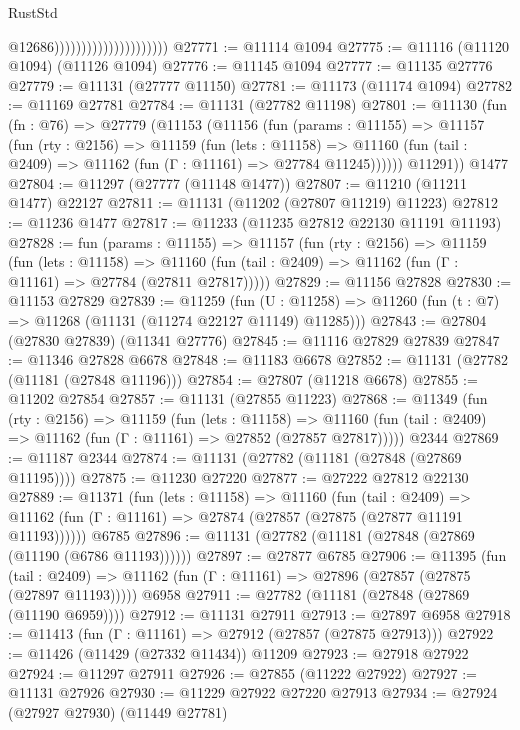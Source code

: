 \begin{lexlean}{RustStd}
\begin{coremodule}
                                              @12686)))))))))))))))))))))
@27771 := @11114 @1094
@27775 := @11116 (@11120 @1094) (@11126 @1094)
@27776 := @11145 @1094
@27777 := @11135 @27776
@27779 := @11131 (@27777 @11150)
@27781 := @11173 (@11174 @1094)
@27782 := @11169 @27781
@27784 := @11131 (@27782 @11198)
@27801 := @11130
    (fun (fn : @76) =>
    @27779
      (@11153
        (@11156
          (fun (params : @11155) =>
          @11157
            (fun (rty : @2156) =>
            @11159
              (fun (lets : @11158) =>
              @11160 (fun (tail : @2409) => @11162 (fun (Γ : @11161) => @27784 @11245))))))
        @11291))
    @1477
@27804 := @11297 (@27777 (@11148 @1477))
@27807 := @11210 (@11211 @1477) @22127
@27811 := @11131 (@11202 (@27807 @11219) @11223)
@27812 := @11236 @1477
@27817 := @11233 (@11235 @27812 @22130 @11191 @11193)
@27828 := fun (params : @11155) =>
  @11157
    (fun (rty : @2156) =>
    @11159
      (fun (lets : @11158) =>
      @11160 (fun (tail : @2409) => @11162 (fun (Γ : @11161) => @27784 (@27811 @27817)))))
@27829 := @11156 @27828
@27830 := @11153 @27829
@27839 := @11259
    (fun (U : @11258) => @11260 (fun (t : @7) => @11268 (@11131 (@11274 @22127 @11149) @11285)))
@27843 := @27804 (@27830 @27839) (@11341 @27776)
@27845 := @11116 @27829 @27839
@27847 := @11346 @27828 @6678
@27848 := @11183 @6678
@27852 := @11131 (@27782 (@11181 (@27848 @11196)))
@27854 := @27807 (@11218 @6678)
@27855 := @11202 @27854
@27857 := @11131 (@27855 @11223)
@27868 := @11349
    (fun (rty : @2156) =>
    @11159
      (fun (lets : @11158) =>
      @11160 (fun (tail : @2409) => @11162 (fun (Γ : @11161) => @27852 (@27857 @27817)))))
    @2344
@27869 := @11187 @2344
@27874 := @11131 (@27782 (@11181 (@27848 (@27869 @11195))))
@27875 := @11230 @27220
@27877 := @27222 @27812 @22130
@27889 := @11371
    (fun (lets : @11158) =>
    @11160
      (fun (tail : @2409) =>
      @11162 (fun (Γ : @11161) => @27874 (@27857 (@27875 (@27877 @11191 @11193))))))
    @6785
@27896 := @11131 (@27782 (@11181 (@27848 (@27869 (@11190 (@6786 @11193))))))
@27897 := @27877 @6785
@27906 := @11395
    (fun (tail : @2409) => @11162 (fun (Γ : @11161) => @27896 (@27857 (@27875 (@27897 @11193)))))
    @6958
@27911 := @27782 (@11181 (@27848 (@27869 (@11190 @6959))))
@27912 := @11131 @27911
@27913 := @27897 @6958
@27918 := @11413 (fun (Γ : @11161) => @27912 (@27857 (@27875 @27913)))
@27922 := @11426 (@11429 (@27332 @11434)) @11209
@27923 := @27918 @27922
@27924 := @11297 @27911
@27926 := @27855 (@11222 @27922)
@27927 := @11131 @27926
@27930 := @11229 @27922 @27220 @27913
@27934 := @27924 (@27927 @27930) (@11449 @27781)

\end{coremodule}
\end{lexlean}
